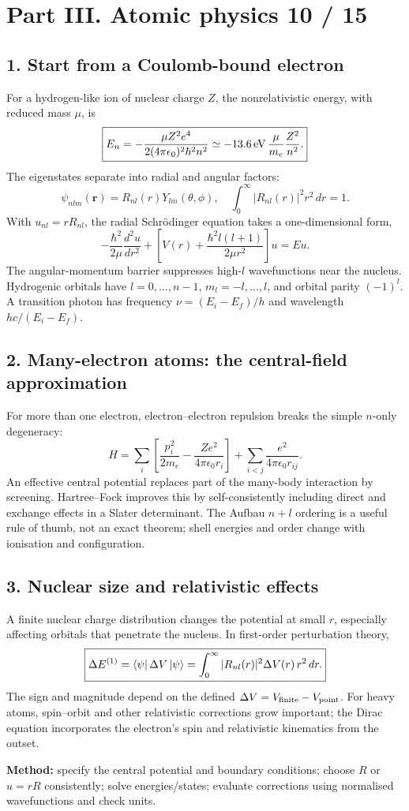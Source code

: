 
\section*{Part III. Atomic physics \hfill 10 / 15}
\subsection*{1. Start from a Coulomb-bound electron}
For a hydrogen-like ion of nuclear charge \(Z\), the nonrelativistic
energy, with reduced mass \(\mu\), is
\[
\boxed{E_n=-\frac{\mu Z^2e^4}
{2(4\pi\epsilon_0)^2\hbar^2n^2}
\simeq-13.6\,{\rm eV}\,
\frac{\mu}{m_e}\frac{Z^2}{n^2}.}
\]
The eigenstates separate into radial and angular factors:
\[
\psi_{nlm}(\mathbf r)=R_{nl}(r)Y_{lm}(\theta,\phi),\quad
\int_0^\infty |R_{nl}(r)|^2r^2\,dr=1.
\]
With \(u_{nl}=rR_{nl}\), the radial Schr\"odinger equation
takes a one-dimensional form,
\[
-\frac{\hbar^2}{2\mu}\frac{d^2u}{dr^2}+
\left[V(r)+\frac{\hbar^2l(l+1)}{2\mu r^2}\right]u=Eu.
\]
The angular-momentum barrier suppresses high-\(l\) wavefunctions
near the nucleus. Hydrogenic orbitals have \(l=0,\ldots,n-1\),
\(m_l=-l,\ldots,l\), and orbital parity \((-1)^l\).
A transition photon has frequency
\(\nu=(E_i-E_f)/h\) and wavelength \(hc/(E_i-E_f)\).

\subsection*{2. Many-electron atoms: the central-field approximation}
For more than one electron, electron--electron repulsion breaks the
simple \(n\)-only degeneracy:
\[
H=\sum_i\left[\frac{p_i^2}{2m_e}
-\frac{Ze^2}{4\pi\epsilon_0r_i}\right]
+\sum_{i<j}\frac{e^2}{4\pi\epsilon_0r_{ij}}.
\]
An effective central potential replaces part of the many-body
interaction by screening. Hartree--Fock improves this by
self-consistently including direct and exchange effects in a
Slater determinant. The Aufbau \(n+l\) ordering is a useful
rule of thumb, not an exact theorem; shell energies and order
change with ionisation and configuration.

\subsection*{3. Nuclear size and relativistic effects}
A finite nuclear charge distribution changes the potential
at small \(r\), especially affecting orbitals that penetrate
the nucleus. In first-order perturbation theory,
\[
\boxed{\Delta E^{(1)}=\left\langle \psi\right\rvert\Delta V\left\lvert \psi\right\rangle
=\int_0^\infty |R_{nl}(r)|^2\Delta V(r)\,r^2\,dr.}
\]
The sign and magnitude depend on the defined
\(\Delta V=V_{\rm finite}-V_{\rm point}\).
For heavy atoms, spin--orbit and other relativistic corrections
grow important; the Dirac equation incorporates the electron's
spin and relativistic kinematics from the outset.
\begin{methodbox}
\textbf{Method:} specify the central potential and boundary conditions;
choose \(R\) or \(u=rR\) consistently; solve energies/states;
evaluate corrections using normalised wavefunctions and check units.
\end{methodbox}
